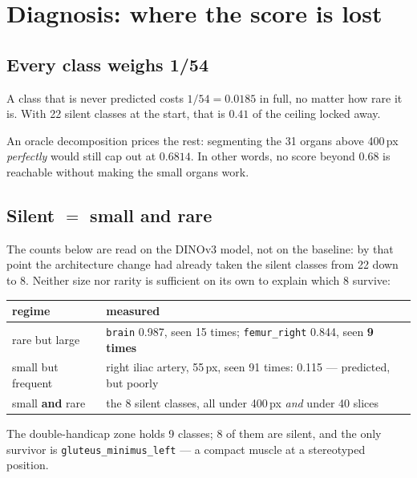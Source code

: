 \documentclass{article}
\begin{document}
\newpage

\section{Diagnosis: where the score is lost}
\label{sec:diagnosis}

\subsection{Every class weighs 1/54}

A class that is never predicted costs $1/54 = 0.0185$ in full, no matter how
rare it is. With 22 silent classes at the start, that is $0.41$ of the ceiling
locked away.

\vspace{2.0mm}

An oracle decomposition prices the rest: segmenting the 31 organs above 400\,px
\emph{perfectly} would still cap out at $0.6814$. In other words, no score beyond
$0.68$ is reachable without making the small organs work.

\subsection{Silent $=$ small \textbf{and} rare}

The counts below are read on the DINOv3 model, not on the baseline: by that point
the architecture change had already taken the silent classes from 22 down to 8.
Neither size nor rarity is sufficient on its own to explain which 8 survive:

\begin{center}
\begin{tabularx}{\textwidth}{lX}
\hline
\textbf{regime} & \textbf{measured} \\
\hline
rare but large & \texttt{brain} 0.987, seen 15 times; \texttt{femur\_right} 0.844, seen \textbf{9 times} \\
small but frequent & right iliac artery, 55\,px, seen 91 times: 0.115 --- predicted, but poorly \\
small \textbf{and} rare & the 8 silent classes, all under 400\,px \emph{and} under 40 slices \\
\hline
\end{tabularx}
\end{center}

\begin{sloppypar}
The double-handicap zone holds 9 classes; 8 of them are silent, and the only
survivor is \texttt{gluteus\_minimus\_left} --- a compact muscle at a
stereotyped position.
\end{sloppypar}
\end{document}
